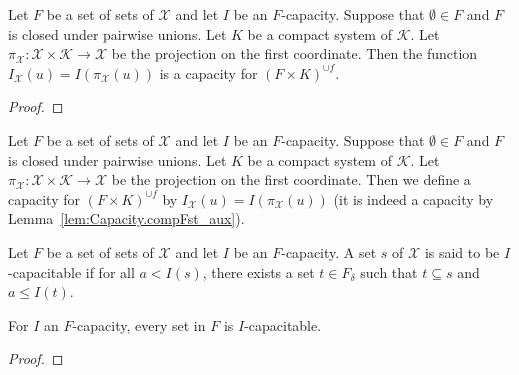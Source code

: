 \begin{lemma}\label{lem:Capacity.compFst_aux}
  \leanok
Let $F$ be a set of sets of $\mathcal{X}$ and let $I$ be an $F$-capacity.
Suppose that $\emptyset \in F$ and $F$ is closed under pairwise unions.
Let $K$ be a compact system of $\mathcal{K}$.
Let $\pi_{\mathcal{X}} : \mathcal{X} \times \mathcal{K} \to \mathcal{X}$ be the projection on the first coordinate.
Then the function $I_{\mathcal{X}}(u) = I(\pi_{\mathcal{X}}(u))$ is a capacity for $(F \times K)^{\cup f}$.
\end{lemma}

\begin{proof}\leanok

\end{proof}


\begin{definition}\label{def:Capacity.compFst}
  \leanok
Let $F$ be a set of sets of $\mathcal{X}$ and let $I$ be an $F$-capacity.
Suppose that $\emptyset \in F$ and $F$ is closed under pairwise unions.
Let $K$ be a compact system of $\mathcal{K}$.
Let $\pi_{\mathcal{X}} : \mathcal{X} \times \mathcal{K} \to \mathcal{X}$ be the projection on the first coordinate.
Then we define a capacity for $(F \times K)^{\cup f}$ by $I_{\mathcal{X}}(u) = I(\pi_{\mathcal{X}}(u))$ (it is indeed a capacity by Lemma~\ref{lem:Capacity.compFst_aux}).
\end{definition}


\begin{definition}\label{def:IsCapacitable}
  \leanok
Let $F$ be a set of sets of $\mathcal{X}$ and let $I$ be an $F$-capacity.
A set $s$ of $\mathcal{X}$ is said to be $I$-capacitable if for all $a < I(s)$, there exists a set $t \in F_\delta$ such that $t \subseteq s$ and $a \le I(t)$.
\end{definition}


\begin{lemma}\label{lem:isCapacitable_of_prop}
  \leanok
For $I$ an $F$-capacity, every set in $F$ is $I$-capacitable.
\end{lemma}

\begin{proof}\leanok

\end{proof}


